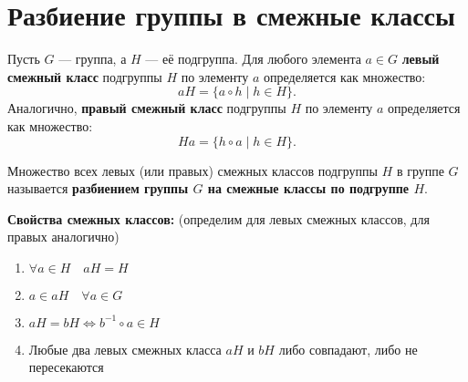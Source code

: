 \section{Разбиение группы в смежные классы}

\begin{shdef}
    \begin{definition} 
    \leavevmode \nl

    Пусть \( G \) — группа, а \( H \) — её подгруппа. Для любого элемента \( a \in G \) \textbf{левый смежный класс} подгруппы \( H \) по элементу \( a \) определяется как множество:
    \[
    aH = \{ a \circ h \mid h \in H \}.
    \]
    Аналогично, \textbf{правый смежный класс} подгруппы \( H \) по элементу \( a \) определяется как множество:
    \[
    Ha = \{ h \circ a \mid h \in H \}.
    \]

    Множество всех левых (или правых) смежных классов подгруппы \( H \) в группе \( G \) называется \textbf{разбиением группы \( G \) на смежные классы по подгруппе \( H \)}.
    \end{definition}
\end{shdef}

\begin{shex}
    \textbf{Свойства смежных классов:} (определим для левых смежных классов, для \\правых аналогично)
    \begin{enumerate}
        \item \( \forall a \in H \quad aH = H \)
        \item \( a \in aH \quad \forall a \in G \)
        \item \( aH = bH \iff b^{-1} \circ a \in H \)
        \item Любые два левых смежных класса \( aH \) и \( bH \) либо совпадают, либо не пересекаются
    \end{enumerate}
\end{shex}

